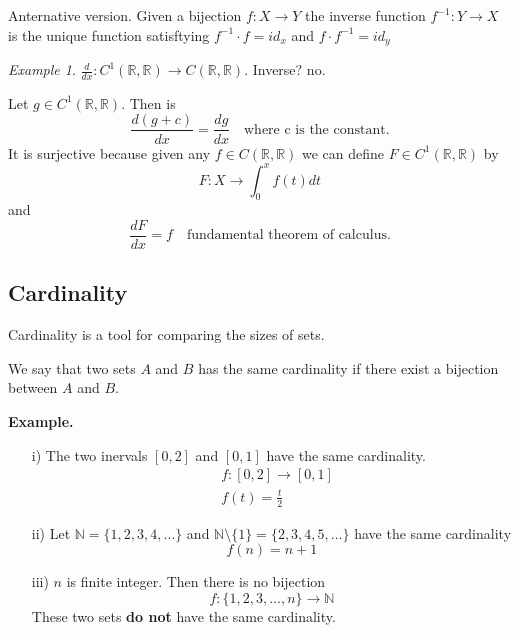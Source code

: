 \documentclass{article}
\theoremstyle{remark}
\newtheorem{example}{Example}
\begin{document}
\begin{definition}
  Anternative version. Given a bijection $f: X\to Y$ the inverse function $f^{-1}: Y \to X$ is the unique function satisftying $f^{-1} \cdot  f = id_{x}$ and $f\cdot f^{-1} = id_{y} $
\end{definition}
\begin{example}
  $\frac{d }{d x}: C^{1}\left( \mathbb{R} , \mathbb{R}  \right) \to C \left( \mathbb{R} ,\mathbb{R}  \right) $. Inverse? no. 
  \par
  Let $g \in C^{1} \left( \mathbb{R} ,\mathbb{R}  \right)$. Then is \[
  \frac{d \left( g + c \right)}{d x} = \frac{d g}{d x} \quad \text{where c is the constant.} 
  \] 
  It is surjective because given any $f \in C\left( \mathbb{R} ,\mathbb{R}  \right)$
  we can define $F \in C^{1}\left( \mathbb{R} ,\mathbb{R}  \right)$ by \[
  F: X \to \int_{0}^{x} f\left( t \right)dt
  \] 
  and \[
  \frac{d F}{d x} = f \quad  \text{fundamental theorem of calculus.} 
  \] 
\end{example}

\subsection{Cardinality}%
\label{sub:cardinality}

Cardinality is a tool for comparing the sizes of sets. 
\begin{definition}
  We say that two sets $A$ and $B$ has the same cardinality if there exist a bijection between $A$ and $B$. 
\end{definition}

\begin{tcolorbox}
  \textbf{Example.}
  \par
  \begin{itemize}
    \item [i)] The two inervals $\left[ 0,2 \right]$ and $\left[ 0,1 \right]$ have the same cardinality. \[
    \begin{split}
       &  f:\left[ 0,2 \right] \to \left[ 0,1 \right]  \\
        &  f\left( t \right) = \frac{t}{2}
    \end{split}
    \] 
  \item [ii)] Let $\mathbb{N}  = \{ 1,2,3,4, \ldots \} $ and $\mathbb{N} \setminus \{1\} = \{2,3,4,5, \ldots\}  $ have the same cardinality \[
  f\left( n \right) = n+1
  \] 
\item [iii)] $n$ is finite integer. Then there is no bijection \[
    f: \{1,2,3, \ldots , n\}  \to \mathbb{N} 
\] 
These two sets \textbf{do not}  have the same cardinality. 
  \end{itemize}

\end{tcolorbox}
\end{document}
